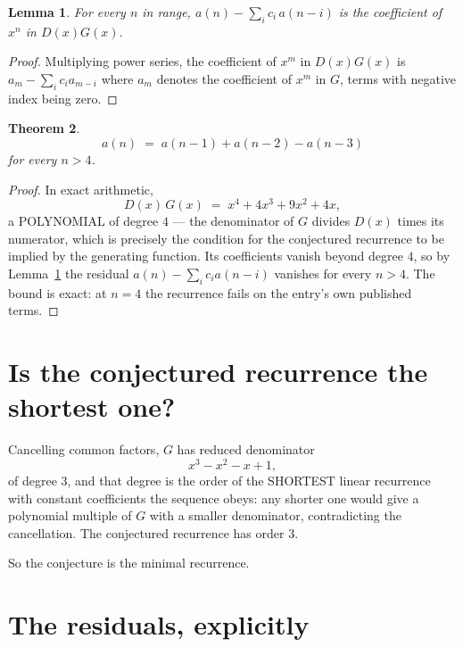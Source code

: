 \documentclass[11pt,a4paper]{article}
\theoremstyle{plain}
\newtheorem{theorem}{Theorem}
\newtheorem{lemma}[theorem]{Lemma}
\theoremstyle{definition}
\begin{document}
\begin{lemma}\label{lem:key}
For every $n$ in range, $a(n)-\sum_i c_i\,a(n-i)$ is the coefficient of $x^{n}$ in
$D(x)G(x)$.
\end{lemma}

\begin{proof}
Multiplying power series, the coefficient of $x^{m}$ in $D(x)G(x)$ is
$a_m-\sum_i c_i a_{m-i}$ where $a_m$ denotes the coefficient of $x^{m}$ in $G$, terms with
negative index being zero.
\end{proof}

\begin{theorem}
\[
a(n)\;=\;a(n-1) + a(n-2) - a(n-3)
\]
for every $n>4$.
\end{theorem}

\begin{proof}
In exact arithmetic,
\[
D(x)\,G(x)\;=\;x^{4} + 4 x^{3} + 9 x^{2} + 4 x,
\]
a POLYNOMIAL of degree $4$ --- the denominator of $G$ divides $D(x)$ times its numerator,
which is precisely the condition for the conjectured recurrence to be implied by the
generating function. Its coefficients vanish beyond degree $4$, so by
Lemma~\ref{lem:key} the residual $a(n)-\sum_ic_ia(n-i)$ vanishes for every
$n>4$. The bound is exact: at $n=4$ the recurrence fails on the entry's own published terms.
\end{proof}

\section{Is the conjectured recurrence the shortest one?}

Cancelling common factors, $G$ has reduced denominator
\[
x^{3} - x^{2} - x + 1,
\]
of degree $3$, and that degree is the order of the SHORTEST linear recurrence with
constant coefficients the sequence obeys: any shorter one would give a polynomial multiple of
$G$ with a smaller denominator, contradicting the cancellation. The conjectured recurrence has
order $3$.

So the conjecture is the minimal recurrence.

\section{The residuals, explicitly}
\end{document}
